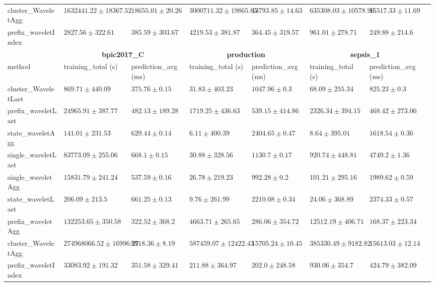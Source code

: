 \documentclass[twoside,11pt]{Latex/Classes/PhDthesisPSnPDF}
\begin{document}
\begin{table}[h]
{\begin{tabular}{llllllll}
		cluster\_WaveletAgg & $1632441.22 \pm 18367.52$ & $18655.01 \pm 20.26$ & $3000711.32 \pm 19865.65$ & $13793.85 \pm 14.63$ & $635308.03 \pm 10578.96$ & $15517.33 \pm 11.69$ \\ 
		prefix\_waveletIndex & $2827.56 \pm 322.61$ & $385.59 \pm 303.67$ & $4219.53 \pm 381.87$ & $364.45 \pm 319.57$ & $961.01 \pm 278.71$ & $\mathbf{249.88 \pm 214.6}$ \\ 
		\bottomrule
		\toprule
		& \multicolumn{2}{c}{{\bfseries bpic2017\_C}} & \multicolumn{2}{c}{{\bfseries production}} & \multicolumn{2}{c}{{\bfseries sepsis\_1}} \\ \cmidrule(lr){2-3} \cmidrule(lr){4-5} \cmidrule(lr){6-7}
		method  & training\_total (s) & prediction\_avg (ms) & training\_total (s) & prediction\_avg (ms) & training\_total (s) & prediction\_avg (ms) \\ \midrule
		cluster\_WaveletLast & $869.71 \pm 440.09$ & $375.76 \pm 0.15$ & $31.83 \pm 403.23$ & $1047.96 \pm 0.3$ & $68.09 \pm 255.34$ & $825.23 \pm 0.3$ \\ 
		prefix\_waveletLast & $24965.91 \pm 387.77$ & $482.13 \pm 189.28$ & $1719.25 \pm 436.63$ & $539.15 \pm 414.86$ & $2326.34 \pm 394.15$ & $468.42 \pm 273.06$ \\ 
		state\_waveletAgg & $\mathbf{141.01 \pm 231.53}$ & $629.44 \pm 0.14$ & $\mathbf{6.11 \pm 400.39}$ & $2404.65 \pm 0.47$ & $\mathbf{8.64 \pm 395.01}$ & $1618.54 \pm 0.36$ \\ 
		single\_waveletLast & $83773.09 \pm 255.06$ & $668.1 \pm 0.15$ & $30.88 \pm 328.56$ & $1130.7 \pm 0.17$ & $920.74 \pm 448.81$ & $4749.2 \pm 1.36$ \\ 
		single\_waveletAgg & $15831.79 \pm 241.24$ & $537.59 \pm 0.16$ & $26.78 \pm 219.23$ & $992.28 \pm 0.2$ & $101.21 \pm 295.16$ & $1989.62 \pm 0.59$ \\ 
		state\_waveletLast & $206.09 \pm 213.5$ & $661.25 \pm 0.13$ & $9.76 \pm 261.99$ & $2210.08 \pm 0.34$ & $24.06 \pm 368.89$ & $2374.33 \pm 0.57$ \\ 
		prefix\_waveletAgg & $132253.65 \pm 350.58$ & $\mathbf{322.52 \pm 368.2}$ & $4663.71 \pm 265.65$ & $286.06 \pm 354.72$ & $12512.19 \pm 406.71$ & $\mathbf{168.37 \pm 223.34}$ \\ 
		cluster\_WaveletAgg & $274968066.52 \pm 16996.27$ & $9918.36 \pm 8.19$ & $587459.07 \pm 12422.43$ & $15705.24 \pm 10.45$ & $385330.49 \pm 9182.82$ & $15613.03 \pm 12.14$ \\ 
		prefix\_waveletIndex & $33083.92 \pm 191.32$ & $351.58 \pm 329.41$ & $211.88 \pm 364.97$ & $\mathbf{202.0 \pm 248.58}$ & $930.06 \pm 354.7$ & $424.79 \pm 382.09$ \\ 

\end{tabular}}
\end{table}
\end{document}

